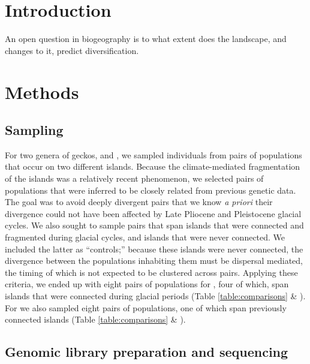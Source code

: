 \section{Introduction}

An open question in biogeography is to what extent does the landscape, and
changes to it, predict diversification.


\section{Methods}

\subsection{Sampling}
For two genera of geckos,  and , we sampled
individuals from pairs of populations that occur on two different islands.
Because the climate-mediated fragmentation of the islands was a relatively
recent phenomenon, we selected pairs of populations that were inferred to be
closely related from previous genetic data.
The goal was to avoid deeply divergent pairs that we know \emph{a priori} their
divergence could not have been affected by Late Pliocene and Pleistocene
glacial cycles.
We also sought to sample pairs that span islands that were connected and
fragmented during glacial cycles, and islands that were never connected.
We included the latter as ``controls;'' because these islands were never
connected, the divergence between the populations inhabiting them must be
dispersal mediated, the timing of which is not expected to be clustered across
pairs.
Applying these criteria, we ended up with eight pairs of populations for
, four of which, span islands that were connected during
glacial periods (Table \ref{table:comparisons} \& ).
For  we also sampled eight pairs of populations, one of which span
previously connected islands (Table \ref{table:comparisons} \& ).

\subsection{Genomic library preparation and sequencing}

